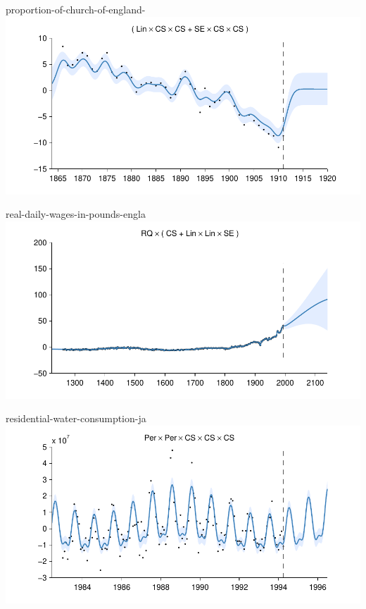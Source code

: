     
\begin{frame}{proportion-of-church-of-england-}
  \center
  \includegraphics[width=1.0\textwidth]{figures/proportion-of-church-of-england-/proportion-of-church-of-england-_all}
\end{frame}  


    
\begin{frame}{real-daily-wages-in-pounds-engla}
  \center
  \includegraphics[width=1.0\textwidth]{figures/real-daily-wages-in-pounds-engla/real-daily-wages-in-pounds-engla_all}
\end{frame}  


    
\begin{frame}{residential-water-consumption-ja}
  \center
  \includegraphics[width=1.0\textwidth]{figures/residential-water-consumption-ja/residential-water-consumption-ja_all}
\end{frame}  


